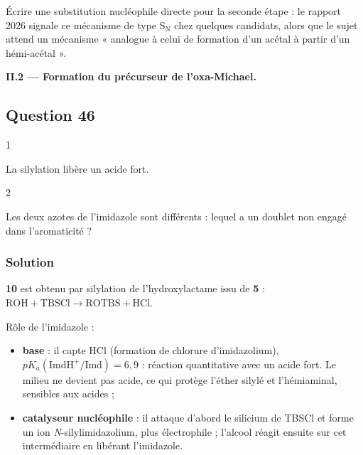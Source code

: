 \documentclass[11pt,a4paper]{article}
\providecommand{\tightlist}{\setlength{\itemsep}{0pt}\setlength{\parskip}{0pt}}
\begin{document}
\begin{piege}

Écrire une substitution nucléophile directe pour la seconde étape : le rapport 2026 signale ce mécanisme de type \(\mathrm{S_N}\) chez quelques candidats, alors que le sujet attend un mécanisme « analogue à celui de formation d'un acétal à partir d'un hémi-acétal ».

\end{piege}

\textbf{II.2 --- Formation du précurseur de l'oxa-Michael.}

\hypertarget{question-46}{%
\subsection{Question 46}\label{question-46}}

\begin{indication}{1}

La silylation libère un acide fort.

\end{indication}

\begin{indication}{2}

Les deux azotes de l'imidazole sont différents : lequel a un doublet non engagé dans l'aromaticité ?

\end{indication}

\hypertarget{solution-45}{%
\subsubsection{Solution}\label{solution-45}}

\textbf{10} est obtenu par silylation de l'hydroxylactame issu de \textbf{5} : \(\mathrm{ROH}+\mathrm{TBSCl}\to\mathrm{ROTBS}+\mathrm{HCl}\).

Rôle de l'imidazole :

\begin{itemize}
\tightlist
\item
  \textbf{base} : il capte HCl (formation de chlorure d'imidazolium), \(pK_a(\mathrm{ImdH^+/Imd})=6{,}9\) : réaction quantitative avec un acide fort. Le milieu ne devient pas acide, ce qui protège l'éther silylé et l'hémiaminal, sensibles aux acides ;
\item
  \textbf{catalyseur nucléophile} : il attaque d'abord le silicium de TBSCl et forme un ion \emph{N}-silylimidazolium, plus électrophile ; l'alcool réagit ensuite sur cet intermédiaire en libérant l'imidazole.
\end{itemize}
\end{document}

